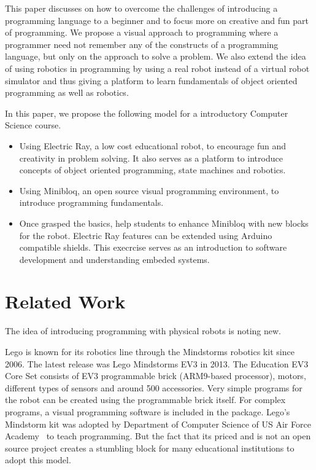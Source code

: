 \documentclass[conference]{IEEEtran}
\begin{document}
This paper discusses on how to overcome the challenges of introducing a programming language to a beginner and to focus more on creative and fun part of programming. We propose a visual approach to programming where a programmer need not remember any of the constructs of a programming language, but only on the approach to solve a problem. We also extend the idea of using robotics in programming by using a real robot instead of a virtual robot simulator and thus giving a platform to learn fundamentals of object oriented programming as well as robotics.

In this paper, we propose the following model for a introductory Computer Science course.

\begin{itemize}

\item Using Electric Ray, a low cost educational robot, to encourage fun and creativity in problem solving. It also serves as a platform to introduce concepts of object oriented programming, state machines and robotics.

\item Using Minibloq, an open source visual programming environment, to introduce programming fundamentals.

\item Once grasped the basics, help students to enhance Minibloq with new blocks for the robot. Electric Ray features can be extended using Arduino compatible shields. This execrcise serves as an introduction to software development and understanding embeded systems.

\end{itemize}

\section{Related Work}

The idea of introducing programming with physical robots is noting new.

Lego is known for its robotics line through the Mindstorms robotics kit since 2006. The latest release was Lego Mindstorms EV3 in 2013. The Education EV3 Core Set consists of EV3 programmable brick (ARM9-based processor), motors, different types of sensors and around 500 accessories. Very simple programs for the robot can be created using the programmable brick itself. For complex programs, a visual programming software is included in the package. Lego's Mindstorm kit was adopted by Department of Computer Science of US Air Force Academy~\cite{lego} to teach programming. But the fact that its priced and is not an open source project creates a stumbling block for many educational institutions to adopt this model.
\end{document}
